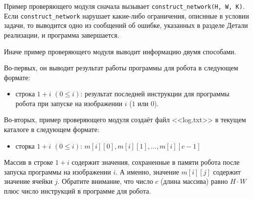 Пример проверяющего модуля сначала вызывает \texttt{construct\_network(H, W, K)}.
Если \texttt{construct\_network} нарушает какие-либо ограничения, описнные в условии
задачи, то выводится одно из сообщений об ошибке, указанных в разделе Детали
реализации, и программа завершается.

Иначе пример проверяющего модуля выводит информацию двумя способами.

Во-первых, он выводит результат работы программы для робота в следующем формате:
\begin{itemize}
\item строка $1+i$ $(0 \leq i)$:  результат последней инструкции для программы робота
при запуске на изображении $i$ ($1$ или $0$).
\end{itemize}

Во-вторых, пример проверяющего модуля создаёт файл <<log.txt>> в текущем
каталоге в следующем формате:
\begin{itemize}
\item сторка $1+i$ $(0 \leq i)$: $m[i][0], m[i][1], \ldots, m[i][c-1]$
\end{itemize}

Массив в строке $1+i$ содержит значения, сохраненные в памяти робота после
запуска программы на изображении $i$. А именно, значение $m[i][j]$ содержит
значение ячейки $j$. Обратите внимание, что число $c$ (длина массива) равно $H \cdot W$
плюс число инструкций в программе для робота.

